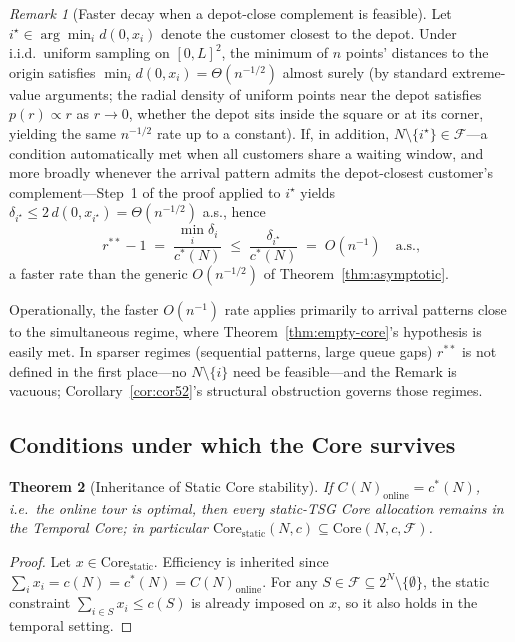 \documentclass[11pt]{article}
\theoremstyle{plain}
\newtheorem{theorem}{Theorem}
\theoremstyle{definition}
\theoremstyle{remark}
\newtheorem{remark}[theorem]{Remark}
\newcommand{\F}{\mathcal{F}}
\newcommand{\cstar}{c^{\ast}}
\begin{document}
\begin{remark}[Faster decay when a depot-close complement is feasible]
\label{rem:asymptotic-tighter}
Let $i^{\star}\in\arg\min_i d(0,x_i)$ denote the customer closest to the depot. Under i.i.d.\ uniform sampling on $[0,L]^2$, the minimum of $n$ points' distances to the origin satisfies $\min_i d(0,x_i) = \Theta(n^{-1/2})$ almost surely (by standard extreme-value arguments; the radial density of uniform points near the depot satisfies $p(r)\propto r$ as $r\to 0$, whether the depot sits inside the square or at its corner, yielding the same $n^{-1/2}$ rate up to a constant). If, in addition, $N\setminus\{i^{\star}\}\in\F$---a condition automatically met when all customers share a waiting window, and more broadly whenever the arrival pattern admits the depot-closest customer's complement---Step~1 of the proof applied to $i^{\star}$ yields $\delta_{i^{\star}} \le 2\,d(0,x_{i^{\star}}) = \Theta(n^{-1/2})$ a.s., hence
\[
r^{\ast\ast}-1 \;=\; \frac{\min_i \delta_i}{\cstar(N)} \;\le\; \frac{\delta_{i^{\star}}}{\cstar(N)} \;=\; O(n^{-1}) \quad\text{a.s.,}
\]
a faster rate than the generic $O(n^{-1/2})$ of Theorem~\ref{thm:asymptotic}.

Operationally, the faster $O(n^{-1})$ rate applies primarily to arrival patterns close to the simultaneous regime, where Theorem~\ref{thm:empty-core}'s hypothesis is easily met. In sparser regimes (sequential patterns, large queue gaps) $r^{\ast\ast}$ is not defined in the first place---no $N\setminus\{i\}$ need be feasible---and the Remark is vacuous; Corollary~\ref{cor:cor52}'s structural obstruction governs those regimes.
\end{remark}

\subsection{Conditions under which the Core survives}
\label{ssec:survive}

\begin{theorem}[Inheritance of Static Core stability]
\label{thm:core-inheritance}
If $C(N)_{\text{online}} = \cstar(N)$, i.e.\ the online tour is optimal, then every static-TSG Core allocation remains in the Temporal Core; in particular $\mathrm{Core}_{\text{static}}(N,c)\subseteq\mathrm{Core}(N,c,\F)$.
\end{theorem}

\begin{proof}
Let $x\in\mathrm{Core}_{\text{static}}$. Efficiency is inherited since $\sum_i x_i = c(N) = \cstar(N) = C(N)_{\text{online}}$. For any $S\in\F\subseteq 2^N\setminus\{\emptyset\}$, the static constraint $\sum_{i\in S} x_i\le c(S)$ is already imposed on $x$, so it also holds in the temporal setting.
\end{proof}
\end{document}
